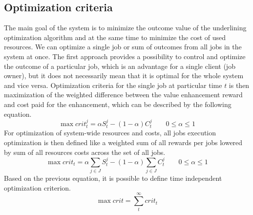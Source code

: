 \subsection{Optimization criteria}\label{subsec:optimization-criteria}
The main goal of the system is to minimize the outcome value of the underlining optimization algorithm
and at the same time to minimize the cost of used resources.
We can optimize a single job or sum of outcomes from all jobs in the system at once.
The first approach provides a possibility to control and optimize the outcome of a particular job,
which is an advantage for a single client (job owner),
but it does not necessarily mean that it is optimal for the whole system and vice versa.
Optimization criteria for the single job at particular time $t$ is then
maximization of the weighted difference between the value enhancement reward 
and cost paid for the enhancement,
which can be described by the following equation.
\begin{equation}
    \max crit_{t}^{j} = \alpha S_{t}^{j} - (1 - \alpha) C_{t}^{j} \qquad 0 \leq \alpha \leq 1 
\end{equation}
For optimization of system-wide resources and costs,
all jobs execution optimization is then defined like a
weighted sum of all rewards per jobs lowered by sum of all resources costs across the set of all jobs.
\begin{equation}
    \max crit_{t} = \alpha \sum_{j \in J} S_{t}^{j} - (1 - \alpha) \sum_{j \in J} C_{t}^{j} \qquad 0 \leq \alpha \leq 1 
\end{equation}
Based on the previous equation, 
it is possible to define time independent optimization criterion.
\begin{equation}
    \max crit = \sum_{t}^{\infty} crit_{t}
\end{equation}